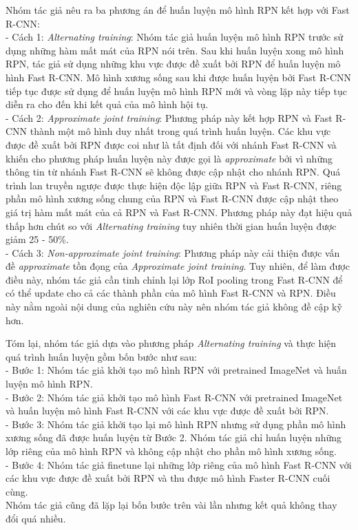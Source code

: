 {    \noindent
    Nhóm tác giả nêu ra ba phương án để huấn luyện mô hình RPN kết hợp với Fast R-CNN: \\
    - Cách 1: \textit{Alternating training}: Nhóm tác giả huấn luyện mô hình RPN trước sử dụng những hàm mất mát của RPN nói trên.
    Sau khi huấn luyện xong mô hình RPN, tác giả sử dụng những khu vực được đề xuất bởi RPN để huấn luyện mô hình Fast R-CNN.
    Mô hình xương sống sau khi được huấn luyện bởi Fast R-CNN tiếp tục được sử dụng để huấn luyện mô hình RPN mới và vòng lặp này tiếp tục diễn ra cho đến khi kết quả của mô hình hội tụ. \\
    - Cách 2: \textit{Approximate joint training}: Phương pháp này kết hợp RPN và Fast R-CNN thành một mô hình duy nhất trong quá trình huấn luyện.
    Các khu vực được đề xuất bởi RPN được coi như là tất định đối với nhánh Fast R-CNN và khiến cho phương pháp huấn luyện này được gọi là \textit{approximate} bởi vì những thông tin từ nhánh Fast R-CNN sẽ không được cập nhật cho nhánh RPN.
    Quá trình lan truyền ngược được thực hiện độc lập giữa RPN và Fast R-CNN, riêng phần mô hình xương sống chung của RPN và Fast R-CNN được cập nhật theo giá trị hàm mất mát của cả RPN và Fast R-CNN.
    Phương pháp này đạt hiệu quả thấp hơn chút so với \textit{Alternating training} tuy nhiên thời gian huấn luyện được giảm 25 - 50\%. \\
    - Cách 3: \textit{Non-approximate joint training}: Phương pháp này cải thiện được vấn đề \textit{approximate} tồn đọng của \textit{Approximate joint training}.
    Tuy nhiên, để làm được điều này, nhóm tác giả cần tinh chỉnh lại lớp RoI pooling trong Fast R-CNN để có thể update cho cả các thành phần của mô hình Fast R-CNN và RPN.
    Điều này nằm ngoài nội dung của nghiên cứu này nên nhóm tác giả không đề cập kỹ hơn.

    \noindent
    Tóm lại, nhóm tác giả dựa vào phương pháp \textit{Alternating training} và thực hiện quá trình huấn luyện gồm bốn bước như sau: \\
    - Bước 1: Nhóm tác giả khởi tạo mô hình RPN với pretrained ImageNet và huấn luyện mô hình RPN. \\
    - Bước 2: Nhóm tác giả khởi tạo mô hình Fast R-CNN với pretrained ImageNet và huấn luyện mô hình Fast R-CNN với các khu vực được đề xuất bởi RPN. \\
    - Bước 3: Nhóm tác giả khởi tạo lại mô hình RPN nhưng sử dụng phần mô hình xương sống đã được huấn luyện từ Bước 2.
    Nhóm tác giả chỉ huấn luyện những lớp riêng của mô hình RPN và không cập nhật cho phần mô hình xương sống. \\
    - Bước 4: Nhóm tác giả finetune lại những lớp riêng của mô hình Fast R-CNN với các khu vực được đề xuất bởi RPN và thu được mô hình Faster R-CNN cuối cùng. \\
    Nhóm tác giả cũng đã lặp lại bốn bước trên vài lần nhưng kết quả không thay đổi quá nhiều.

}
